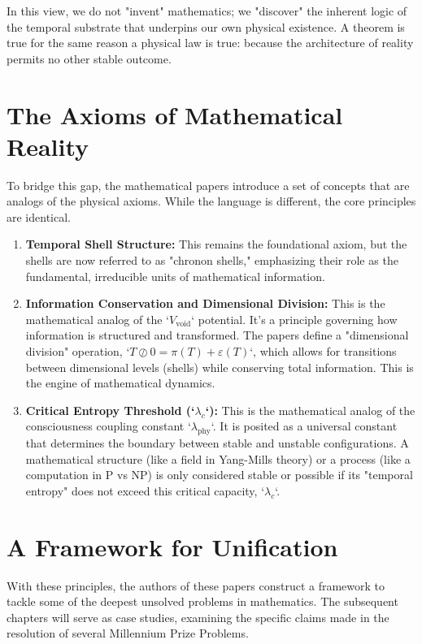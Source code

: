 \documentclass[12pt]{report}
\begin{document}
In this view, we do not "invent" mathematics; we "discover" the inherent logic of the temporal substrate that underpins our own physical existence. A theorem is true for the same reason a physical law is true: because the architecture of reality permits no other stable outcome.

\section{The Axioms of Mathematical Reality}
To bridge this gap, the mathematical papers introduce a set of concepts that are analogs of the physical axioms. While the language is different, the core principles are identical.
\begin{enumerate}
    \item \textbf{Temporal Shell Structure:} This remains the foundational axiom, but the shells are now referred to as "chronon shells," emphasizing their role as the fundamental, irreducible units of mathematical information.
    \item \textbf{Information Conservation and Dimensional Division:} This is the mathematical analog of the `$V_{\text{void}}$` potential. It's a principle governing how information is structured and transformed. The papers define a "dimensional division" operation, `$T \oslash 0 = \pi(T) + \varepsilon(T)$`, which allows for transitions between dimensional levels (shells) while conserving total information. This is the engine of mathematical dynamics.
    \item \textbf{Critical Entropy Threshold (`$\lambda_c$`):} This is the mathematical analog of the consciousness coupling constant `$\lambda_{\text{phy}}$`. It is posited as a universal constant that determines the boundary between stable and unstable configurations. A mathematical structure (like a field in Yang-Mills theory) or a process (like a computation in P vs NP) is only considered stable or possible if its "temporal entropy" does not exceed this critical capacity, `$\lambda_c$`.
\end{enumerate}

\section{A Framework for Unification}
With these principles, the authors of these papers construct a framework to tackle some of the deepest unsolved problems in mathematics. The subsequent chapters will serve as case studies, examining the specific claims made in the resolution of several Millennium Prize Problems.
\end{document}
